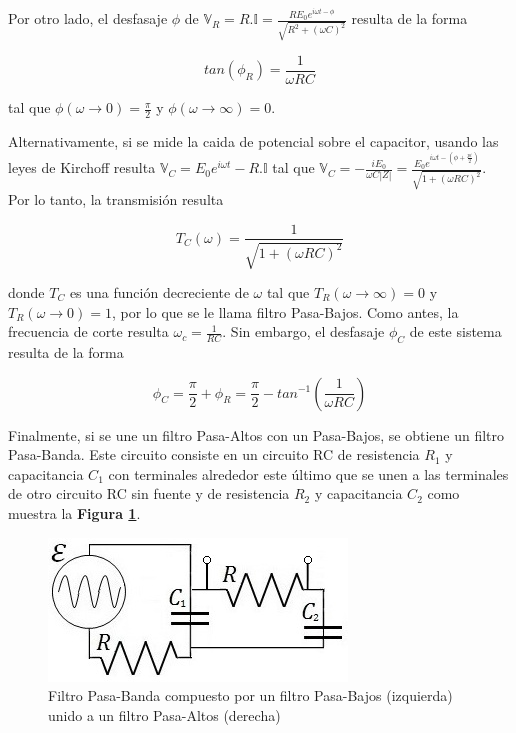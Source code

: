\documentclass[11pt,a4paper]{article}
\begin{document}
Por otro lado, el desfasaje $\phi$ de $\mathbb{V}_R = R.\mathbb{I} = \frac{RE_0e^{i\omega t - \phi}}{\sqrt{R^2+(\omega C)^2}}$ resulta de la forma

\begin{equation}
tan(\phi_R) = \frac{1}{\omega R C}
\label{des_PA}
\end{equation}

tal que $\phi(\omega \rightarrow 0) = \frac{\pi}{2}$ y $\phi(\omega \rightarrow \infty) = 0$.

Alternativamente, si se mide la caida de potencial sobre el capacitor, usando las leyes de Kirchoff resulta $\mathbb{V}_C = E_0e^{i\omega t} - R.\mathbb{I}$ tal que $\mathbb{V}_C = -\frac{iE_0}{\omega C|Z|} = \frac{E_0e^{i\omega t -(\phi+\frac{pi}{2})}}{\sqrt{1+(\omega RC)^2}}$. Por lo tanto, la transmisión resulta

\begin{equation}
T_C(\omega) = \frac{1}{\sqrt{1+(\omega RC)^2}}
\label{trans_PBaj}
\end{equation}

donde $T_C$ es una función decreciente de $\omega$ tal que $T_R(\omega \rightarrow \infty) = 0$ y $T_R(\omega \rightarrow 0) = 1$, por lo que se le llama filtro Pasa-Bajos. Como antes, la frecuencia de corte resulta $\omega_c = \frac{1}{RC}$. Sin embargo, el desfasaje $\phi_C$ de este sistema resulta de la forma 

\begin{equation}
\phi_C = \frac{\pi}{2}+\phi_R = \frac{\pi}{2} - tan^{-1}(\frac{1}{\omega R C})
\label{des_PBaj}
\end{equation}

Finalmente, si se une un filtro Pasa-Altos con un Pasa-Bajos, se obtiene un filtro Pasa-Banda. Este circuito consiste en un circuito RC de resistencia $R_1$ y capacitancia $C_1$ con terminales alrededor este último que se unen a las terminales de otro circuito RC sin fuente y de resistencia $R_2$ y capacitancia $C_2$ como muestra la \textbf{Figura \ref{fig:intro}}.

\begin{figure}[h]
\centering
\includegraphics[scale=0.75]{Figura_Intro}
  \caption{Filtro Pasa-Banda compuesto por un filtro Pasa-Bajos (izquierda) unido a un filtro Pasa-Altos (derecha)}
  \label{fig:intro}
\end{figure}
\end{document}
